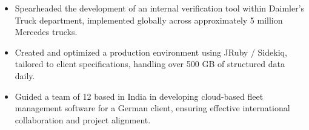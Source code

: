 \begin{itemize}
  \item Spearheaded the development of an internal verification tool within Daimler's Truck department, implemented globally across approximately 5 million Mercedes trucks.
  \item Created and optimized a production environment using JRuby / Sidekiq, tailored to client specifications, handling over 500 GB of structured data daily.
  \item Guided a team of 12 based in India in developing cloud-based fleet management software for a German client, ensuring effective international collaboration and project alignment.
\end{itemize}
\divider
